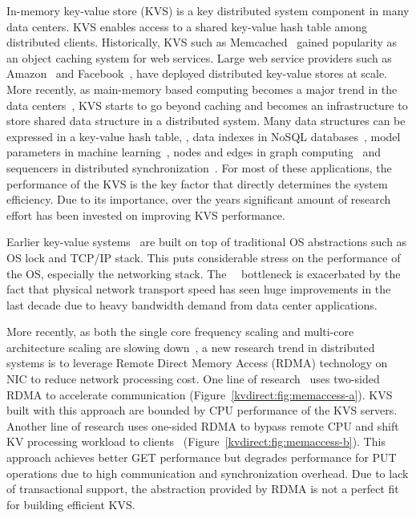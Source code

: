 In-memory key-value store (KVS) is a key distributed system component in many data centers. KVS enables access to a shared key-value hash table among distributed clients. Historically, KVS such as Memcached~\cite{fitzpatrick2004distributed} gained popularity as an object caching system for web services. Large web service providers such as  Amazon~\cite{decandia2007dynamo} and Facebook~\cite{atikoglu2012workload, nishtala2013scaling}, have deployed distributed key-value stores at scale. More recently, as main-memory based computing becomes a major trend in the data centers~\cite{ousterhout2010case,dragojevic2014farm}, KVS starts to go beyond caching and becomes an infrastructure to store shared data structure in a distributed system.
Many data structures can be expressed in a key-value hash table, \eg, data indexes in NoSQL databases~\cite{chang2008bigtable}, model parameters in machine learning~\cite{li2014scaling}, nodes and edges in graph computing~\cite{shao2013trinity, xiao17tux2} and sequencers in distributed synchronization~\cite{kalia2016design}. For most of these applications, the performance of the KVS is the key factor that directly determines the system efficiency. Due to its importance, over the years significant amount of research effort has been invested on improving KVS performance. 

Earlier key-value systems~\cite{decandia2007dynamo, fitzpatrick2004distributed, nishtala2013scaling} are built on top of traditional OS abstractions such as OS lock and TCP/IP stack. This puts considerable stress on the performance of the OS, especially the networking stack. The 　bottleneck is exacerbated by the fact that physical network transport speed has seen huge improvements in the last decade due to heavy bandwidth demand from data center applications. 

More recently, as both the single core frequency scaling and multi-core architecture scaling are slowing down~\cite{sutter2005free,esmaeilzadeh2011dark}, a new research trend in distributed systems is to leverage Remote Direct Memory Access (RDMA) technology on NIC to reduce network processing cost. One line of research~\cite{kalia2014using, kalia2016design} uses two-sided RDMA to accelerate communication (Figure~\ref{kvdirect:fig:memaccess-a}). KVS built with this approach are bounded by CPU performance of the KVS servers. Another line of research uses one-sided RDMA to bypass remote CPU and shift KV processing workload to clients~\cite{dragojevic2014farm, mitchell2013using} (Figure~\ref{kvdirect:fig:memaccess-b}). This approach achieves better GET performance but degrades performance for PUT operations due to high communication and synchronization overhead. Due to lack of transactional support, the abstraction provided by RDMA is not a perfect fit for building efficient KVS. 

